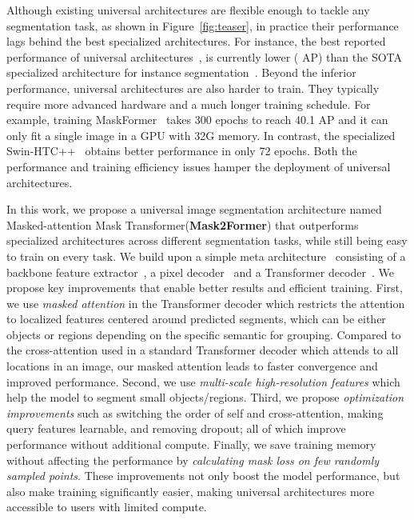 \documentclass[10pt,twocolumn,letterpaper]{article}
\newcommand{\modelname}{Mask2Former\xspace}
\newcommand{\modelnamelong}{Masked-attention Mask Transformer\xspace}
\newcommand{\figref}[1]{Figure~\ref{#1}}
\begin{document}
Although existing universal architectures are flexible enough to tackle any segmentation task, as shown in \figref{fig:teaser}, in practice their performance lags behind the best specialized architectures.
For instance, the best reported performance of universal architectures~\cite{cheng2021maskformer,zhang2021knet}, is currently lower ( AP) than the SOTA specialized architecture for instance segmentation~\cite{chen2019hybrid}.
Beyond the inferior performance, universal architectures are also harder to train. They typically require more advanced hardware and a much longer training schedule. For example, training MaskFormer~\cite{cheng2021maskformer} takes 300 epochs to reach 40.1 AP and it can only fit a single image in a GPU with 32G memory. In contrast, the specialized Swin-HTC++~\cite{chen2019hybrid} obtains better performance in only 72 epochs. Both the performance and training efficiency issues hamper the deployment of universal architectures.


In this work, we propose a universal image segmentation architecture named \modelnamelong (\textbf{\modelname}) that outperforms specialized architectures across different segmentation tasks, while still being easy to train on every task.
We build upon a simple meta architecture~\cite{cheng2021maskformer} consisting of a
backbone feature extractor~\cite{he2016deep,liu2021swin}, a pixel decoder~\cite{lin2016feature} and a Transformer decoder~\cite{vaswani2017attention}.
We propose key improvements that enable better results and efficient training.
First, we use \emph{masked attention} in the Transformer decoder which restricts the attention to localized features centered around predicted segments, which can be either objects or regions depending on the specific semantic for grouping.
Compared to the  cross-attention used in a standard Transformer decoder which attends to all locations in an image, our masked attention leads to faster convergence and improved performance.
Second, we use \emph{multi-scale high-resolution features} which help the model to segment small objects/regions.
Third, we propose \emph{optimization improvements} such as switching the order of self and cross-attention, making query features learnable, and removing dropout; all of which improve performance without additional compute.
Finally, we save  training memory without affecting the performance by \emph{calculating mask loss on few randomly sampled points}.
These improvements not only boost the model performance, but also make training significantly easier, making universal architectures more accessible to users with limited compute.
\end{document}
